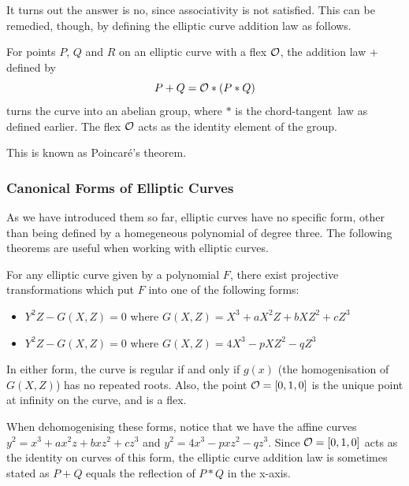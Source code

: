 It turns out the answer is no, since associativity is not satisfied. This can be remedied, though, by defining the elliptic curve addition law as follows.
\begin{theorem}
	For points $P$, $Q$ and $R$ on an elliptic curve with a flex $\mathcal{O}$, the addition law $+$ defined by
	$$P + Q = \mathcal{O} * (P * Q)$$
	turns the curve into an abelian group, where $*$ is the chord-tangent~law as defined earlier.
	The flex $\mathcal{O}$ acts as the identity element of the group.
\end{theorem}
This is known as Poincaré's theorem.
\subsubsection{Canonical Forms of Elliptic Curves}
As we have introduced them so far, elliptic curves have no specific form, other than being defined by a homegeneous polynomial of degree three.
The following theorems are useful when working with elliptic curves.
\begin{theorem}
	For any elliptic curve given by a polynomial $F$, there exist projective transformations which put $F$ into one of the following forms:
	\begin{itemize}
		\item $Y^2Z - G(X,Z) = 0$ where $G(X,Z) = X^3 + aX^2Z + bXZ^2 + cZ^3$
		\item $Y^2Z - G(X,Z) = 0$ where $G(X,Z) = 4X^3 - pXZ^2 - qZ^3$
	\end{itemize}
	In either form, the curve is regular if and only if $g(x)$ (the homogenisation of $G(X,Z)$) has no repeated roots. Also, the point $\mathcal{O} = [0,1,0]$ is the unique point at infinity on the curve, and is a flex.
\end{theorem}
When dehomogenising these forms, notice that we have the affine curves $y^2 = x^3 + ax^2z + bxz^2 + cz^3$ and $y^2 = 4x^3 - pxz^2 - qz^3$.
Since $\mathcal{O} = [0,1,0]$ acts as the identity on curves of this form, the elliptic curve addition law is sometimes stated as $P + Q$ equals the reflection of $P * Q$ in the x-axis.
